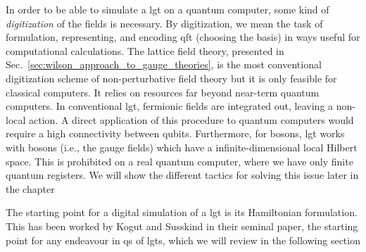 In order to be able to simulate a \ac{lgt} on a quantum computer, some kind of \emph{digitization} of the fields is necessary.
By digitization, we mean the task of formulation, representing, and encoding \ac{qft} (choosing the basis) in ways useful for computational calculations.
The lattice field theory, presented in Sec.~\ref{sec:wilson_approach_to_gauge_theories}, is the most conventional digitization scheme of non-perturbative field theory but it is only feasible for classical computers.
It relies on resources far beyond near-term quantum computers.
In conventional \ac{lgt}, fermionic fields are integrated out, leaving a non-local action.
A direct application of this procedure to quantum computers would require a high connectivity between qubits.
Furthermore, for bosons, \ac{lgt} works with bosons (i.e., the gauge fields) which have a infinite-dimensional local Hilbert space.
This is prohibited on a real quantum computer, where we have only finite quantum registers.
We will show the different tactics for solving this issue later in the chapter

The starting point for a digital simulation of a \ac{lgt} is its Hamiltonian formulation.
This has been worked by Kogut and Susskind in their seminal paper\citneeded, the starting point for any endeavour in \ac{qs} of \ac{lgt}s, which we will review in the following section



